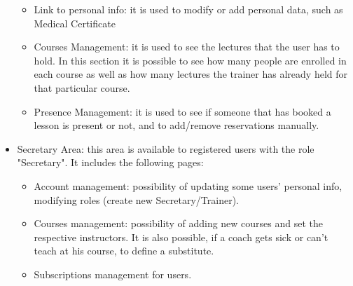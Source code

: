\begin{itemize}
	\begin{itemize}
		\item Link to personal info: it is used to modify or add personal data, such as Medical Certificate
		\item Courses Management: it is used to see the lectures that the user has to hold. In this section it is possible to see how many people are enrolled in each course as well as how many lectures the trainer has already held for that particular course.
		\item Presence Management: it is used to see if someone that has booked a lesson is present or not, and to add/remove reservations manually.
	\end{itemize}
	\item Secretary Area: this area is available to registered users with the role "Secretary".
	It includes the following pages:
	\begin{itemize}
		\item Account management: possibility of updating some users' personal info, modifying roles (create new Secretary/Trainer).
		\item Courses management: possibility of adding new courses and set the respective instructors. It is also possible, if a coach gets sick or can't teach at his course, to define a substitute.
		\item Subscriptions management for users.
	\end{itemize}
\end{itemize}
